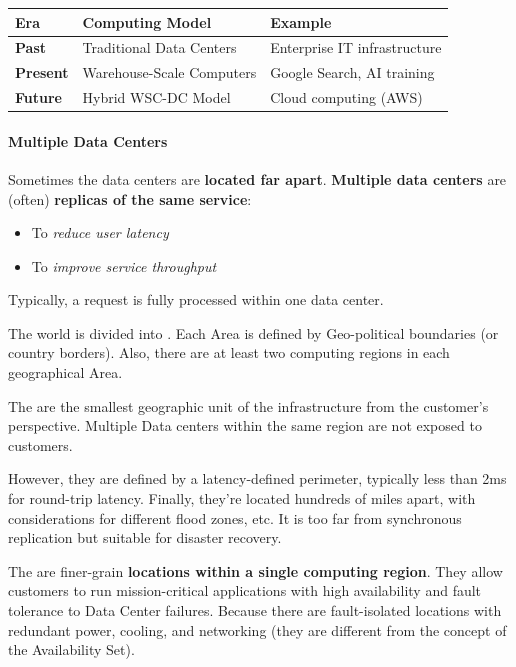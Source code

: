 \begin{table}[!htp]
    \centering
    \begin{tabular}{@{} l | l | l @{}}
        \toprule
        \textbf{Era} & \textbf{Computing Model} & \textbf{Example} \\
        \midrule
        \textbf{Past} & Traditional Data Centers & Enterprise IT infrastructure \\ [.3em]
        \textbf{Present} & Warehouse-Scale Computers & Google Search, AI training \\ [.3em]
        \textbf{Future} & Hybrid WSC-DC Model & Cloud computing (AWS) \\
        \bottomrule
    \end{tabular}
\end{table}

\newpage

\paragraph{Multiple Data Centers}

\noindent
Sometimes the data centers are \textbf{located far apart}. \textbf{Multiple data centers} are (often) \textbf{replicas of the same service}:
\begin{itemize}
    \item To \emph{reduce user latency}
    \item To \emph{improve service throughput}
\end{itemize}
Typically, a request is fully processed within one data center.

\highspace
The world is divided into . Each Area is defined by Geo-political boundaries (or country borders). Also, there are at least two computing regions in each geographical Area.

\highspace
The  are the smallest geographic unit of the infrastructure from the customer's perspective. Multiple Data centers within the same region are not exposed to customers.

However, they are defined by a latency-defined perimeter, typically less than 2ms for round-trip latency.
Finally, they're located hundreds of miles apart, with considerations for different flood zones, etc. It is too far from synchronous replication but suitable for disaster recovery.

\highspace
The  are finer-grain \textbf{locations within a single computing region}. They allow customers to run mission-critical applications with high availability and fault tolerance to Data Center failures. Because there are fault-isolated locations with redundant power, cooling, and networking (they are different from the concept of the Availability Set).

